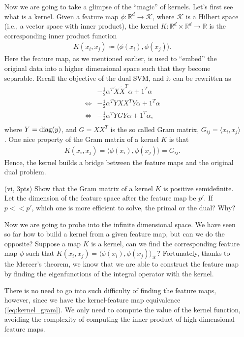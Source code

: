 \documentclass{article}
\theoremstyle{remark}
\theoremstyle{definition}
\newcommand{\ones}{\mathrm 1}
\newcommand{\diag}{\mathop{\rm diag}}
\newcommand{\reals}{\mathbb R}
\begin{document}
\begin{enumerate}
Now we are going to take a glimpse of the ``magic'' of kernels. Let's first see what is a kernel. Given a feature map $\phi: \reals^d \to \mathcal{K}$, where $\mathcal{K}$ is a Hilbert space (i.e., a vector space with inner product), the kernel $K: \reals^d \times \reals^d \to \reals$ is the corresponding inner product function
\begin{align}
K(x_i, x_j) \coloneqq \langle \phi(x_i), \phi(x_j)\rangle.
\label{eq:kernel}
\end{align}
Here the feature map, as we mentioned earlier, is used to ``embed'' the original data into a higher dimensional space such that they become separable.
Recall the objective of the dual SVM, and it can be rewritten as
\begin{align}
&-\tfrac1{2} \alpha^T \tilde X \tilde X^T \alpha + \ones^T \alpha \\
\Leftrightarrow & -\tfrac1{2} \alpha^T YXX^TY \alpha + \ones^T \alpha \\
\Leftrightarrow & -\tfrac1{2} \alpha^T YGY \alpha + \ones^T \alpha, \\
\label{eq:obj_kernel}
\end{align}
where $Y = \diag(y)$, and $G = XX^T$ is the so called Gram matrix, $G_{ij} = \langle x_i, x_j\rangle$. One nice property of the Gram matrix of a kernel $K$ is that
\begin{align}
K(x_i, x_j) = \langle \phi(x_i), \phi(x_j)\rangle = G_{ij}.
\label{eq:kernel_gram}
\end{align}
Hence, the kernel builds a bridge between the feature maps and the original dual problem.

\item[(vi, 3pts)] Show that the Gram matrix of a kernel $K$ is positive semidefinite.
Let the dimension of the feature space after the feature map be $p'$. If $p << p'$, which one is more efficient to solve, the primal or the dual? Why?

Now we are going to probe into the infinite dimensional space. We have seen so far how to build a kernel from a given feature map, but can we do the opposite? Suppose a map $K$ is a kernel, can we find the corresponding feature map $\phi$ such that $K(x_i, x_j) = \langle \phi(x_i), \phi(x_j)\rangle_{\mathcal{K}}$? Fortunately, thanks to the Mercer's theorem, we know that we are able to construct the feature map by finding the eigenfunctions of the integral operator with the kernel. 

There is no need to go into such difficulty of finding the feature maps, however, since we have the kernel-feature map equivalence (\ref{eq:kernel_gram}). We only need to compute the value of the kernel function, avoiding the complexity of computing the inner product of high dimensional feature maps. 


\end{enumerate}
\end{document}
